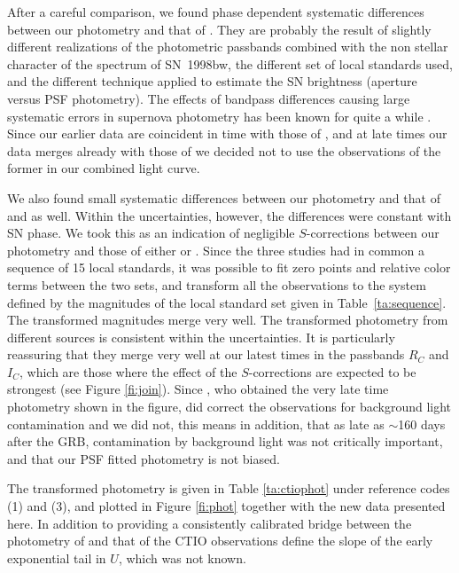 \documentclass[12pt,preprint]{aastex}
\begin{document}
After a careful comparison,
we found phase dependent systematic differences between our photometry and that of \citet{mands99}.
%
They are probably the result of slightly different realizations of the photometric passbands combined with
the non stellar character of the spectrum of SN~1998bw, the different set of local standards used, and the
different technique applied to estimate the SN brightness (aperture versus PSF photometry).
%
The effects of bandpass differences causing large systematic errors in supernova photometry has
been known for quite a while \citep{setal88}.
%
Since our earlier data are coincident in time with those of \citet{mands99}, and at late times our data merges
already with those of \citet{soetal02} we decided not to use the observations of the former in our combined
light curve.

We also found small systematic differences between our photometry and that of \citet{getal98} and \citet{soetal02} as well.
%
Within the uncertainties, however, the differences were constant with SN phase.
%
We took this as an indication of negligible $S$-corrections between our photometry and those of either \citet{getal98} or \citet{soetal02}.
%
Since the three studies had in common a sequence of 15 local standards, it was possible to fit zero points and relative color terms
between the two sets, and transform all the observations to the system defined by the magnitudes of the local standard set
given in Table~\ref{ta:sequence}.
%
The transformed magnitudes merge very well.
%
The transformed photometry from different sources is consistent within the
uncertainties.
%
It is particularly reassuring that they merge very well at our latest times
in the passbands $R_C$ and $I_C$, which are those where the effect of
the $S$-corrections are expected to be strongest (see Figure \ref{fi:join}).
%
Since \citet{soetal02}, who obtained the very late time photometry shown in the figure, did correct the observations for background light
contamination and we did not, this
means in addition, that as late as $\sim$160 days after the GRB, contamination by background light was not critically important, and that
our PSF fitted photometry is not biased.

The transformed photometry is given in Table \ref{ta:ctiophot} under reference codes (1) and (3), and plotted in Figure \ref{fi:phot}
together with the new data presented here.
%
In addition to providing a consistently calibrated bridge between the photometry of \citet{getal98} and that of \citet{soetal02} the CTIO
observations define the slope of the early exponential tail in $U$, which was not known.
\end{document}
